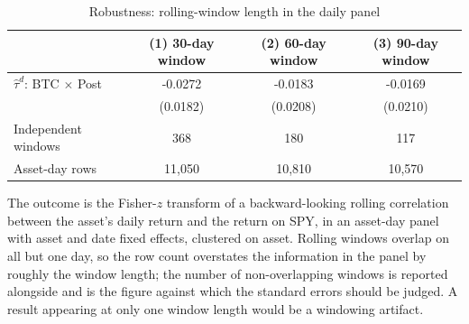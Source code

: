 \begin{table}[t]
\centering
\begin{threeparttable}
\caption{Robustness: rolling-window length in the daily panel}
\label{tab:robustness_windows}
\begin{tabular}{lccc}
\toprule
 & (1) 30-day window & (2) 60-day window & (3) 90-day window \\
\midrule
$\hat\tau^{d}$: BTC $\times$ Post & -0.0272 & -0.0183 & -0.0169 \\
 & (0.0182) & (0.0208) & (0.0210) \\
Independent windows & 368 & 180 & 117 \\
Asset-day rows & 11,050 & 10,810 & 10,570 \\
\bottomrule
\end{tabular}
\begin{tablenotes}[flushleft]
\footnotesize
\item The outcome is the Fisher-$z$ transform of a backward-looking rolling correlation between the asset's daily return and the return on SPY, in an asset-day panel with asset and date fixed effects, clustered on asset. Rolling windows overlap on all but one day, so the row count overstates the information in the panel by roughly the window length; the number of non-overlapping windows is reported alongside and is the figure against which the standard errors should be judged. A result appearing at only one window length would be a windowing artifact.
\end{tablenotes}
\end{threeparttable}
\end{table}
